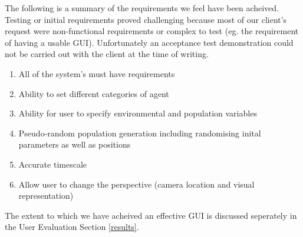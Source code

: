 The following is a summary of the requirements we feel have been acheived. Testing or initial requirements proved challenging because most of our client's request were non-functional requirements or complex to test (eg. the requirement of having a usable GUI). Unfortunately an acceptance test demonstration could not be carried out with the client at the time of writing.

\begin{enumerate}
\item{All of the system's must have requirements}
\item{Ability to set different categories of agent}
\item{Ability for user to specify environmental and population variables}
\item{Pseudo-random population generation including randomising inital parameters as well as positions}
\item{Accurate timescale}
\item{Allow user to change the perspective (camera location and visual representation)}
\end{enumerate}

The extent to which we have acheived an effective GUI is discussed seperately in the User Evaluation Section \ref{results}. 
